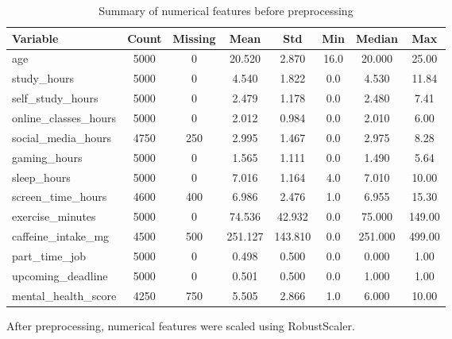 \begin{table}[t]
\centering
\caption{Summary of numerical features before preprocessing}
\begin{tabular}{lccccccc}
\toprule
\textbf{Variable} & \textbf{Count} & \textbf{Missing} & \textbf{Mean} & \textbf{Std} & \textbf{Min} & \textbf{Median} & \textbf{Max} \\
\midrule
age & 5000 & 0 & 20.520 & 2.870 & 16.0 & 20.000 & 25.00 \\
study\_hours & 5000 & 0 & 4.540 & 1.822 & 0.0 & 4.530 & 11.84 \\
self\_study\_hours & 5000 & 0 & 2.479 & 1.178 & 0.0 & 2.480 & 7.41 \\
online\_classes\_hours & 5000 & 0 & 2.012 & 0.984 & 0.0 & 2.010 & 6.00 \\
social\_media\_hours & 4750 & 250 & 2.995 & 1.467 & 0.0 & 2.975 & 8.28 \\
gaming\_hours & 5000 & 0 & 1.565 & 1.111 & 0.0 & 1.490 & 5.64 \\
sleep\_hours & 5000 & 0 & 7.016 & 1.164 & 4.0 & 7.010 & 10.00 \\
screen\_time\_hours & 4600 & 400 & 6.986 & 2.476 & 1.0 & 6.955 & 15.30 \\
exercise\_minutes & 5000 & 0 & 74.536 & 42.932 & 0.0 & 75.000 & 149.00 \\
caffeine\_intake\_mg & 4500 & 500 & 251.127 & 143.810 & 0.0 & 251.000 & 499.00 \\
part\_time\_job & 5000 & 0 & 0.498 & 0.500 & 0.0 & 0.000 & 1.00 \\
upcoming\_deadline & 5000 & 0 & 0.501 & 0.500 & 0.0 & 1.000 & 1.00 \\
mental\_health\_score & 4250 & 750 & 5.505 & 2.866 & 1.0 & 6.000 & 10.00 \\
\bottomrule
\end{tabular}
\end{table}

After preprocessing, numerical features were scaled using RobustScaler.


